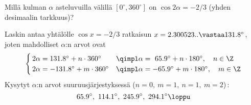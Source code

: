 \begin{Exa} Millä kulman $\alpha$ asteluvuilla välillä $[0^{\circ},360^{\circ}]$ on
$\cos 2\alpha=-2/3$ (yhden desimaalin tarkkuus)?
\end{Exa}
\ratk Laskin antaa yhtälölle $\cos x=-2/3$ ratkaisun $x=2.300523.. \vastaa 131.8^{\circ}$,
joten mahdolliset $\alpha$:n arvot ovat
\[ \begin{cases}
\,2\alpha = 131.8^{\circ} + n \cdot 360^{\circ} 
               &\qimpl \alpha = \ 65.9^{\circ} + n \cdot 180^{\circ}, \quad n\in\Z \\
\,2\alpha = -131.8^{\circ} + m \cdot 360^{\circ} 
               &\qimpl \alpha =  -65.9^{\circ} + m \cdot 180^{\circ}, \quad m\in\Z
\end{cases} \]
Kysytyt $\alpha$:n arvot suuruusjärjestyksessä ($n=0,\ m=1,\ n=1,\ m=2$)\,:
\[
65.9^{\circ},\ 114.1^{\circ},\ 245.9^{\circ},\ 294.1^{\circ} \loppu
\]

